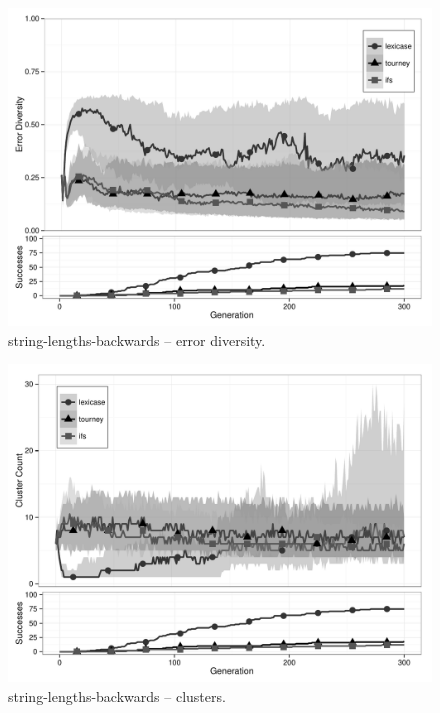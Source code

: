 \begin{figure}%
\centering
\includegraphics[width=11.5cm]{string-lengths-backwards-diversity.pdf}
\caption{string-lengths-backwards -- error diversity.}
\label{string-lengths-backwardsDiv}
\end{figure}

\begin{figure}%
\centering
\includegraphics[width=11.5cm]{string-lengths-backwards-cluster.pdf}
\caption{string-lengths-backwards -- clusters.}
\label{string-lengths-backwardsClu}
\end{figure}

